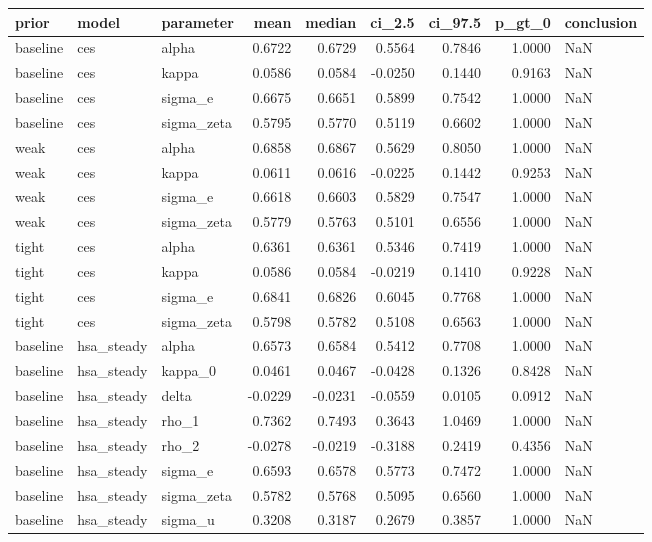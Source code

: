 \begin{tabular}{lllrrrrrl}
\toprule
prior & model & parameter & mean & median & ci\_2.5 & ci\_97.5 & p\_gt\_0 & conclusion \\
\midrule
baseline & ces & alpha & 0.6722 & 0.6729 & 0.5564 & 0.7846 & 1.0000 & NaN \\
baseline & ces & kappa & 0.0586 & 0.0584 & -0.0250 & 0.1440 & 0.9163 & NaN \\
baseline & ces & sigma\_e & 0.6675 & 0.6651 & 0.5899 & 0.7542 & 1.0000 & NaN \\
baseline & ces & sigma\_zeta & 0.5795 & 0.5770 & 0.5119 & 0.6602 & 1.0000 & NaN \\
weak & ces & alpha & 0.6858 & 0.6867 & 0.5629 & 0.8050 & 1.0000 & NaN \\
weak & ces & kappa & 0.0611 & 0.0616 & -0.0225 & 0.1442 & 0.9253 & NaN \\
weak & ces & sigma\_e & 0.6618 & 0.6603 & 0.5829 & 0.7547 & 1.0000 & NaN \\
weak & ces & sigma\_zeta & 0.5779 & 0.5763 & 0.5101 & 0.6556 & 1.0000 & NaN \\
tight & ces & alpha & 0.6361 & 0.6361 & 0.5346 & 0.7419 & 1.0000 & NaN \\
tight & ces & kappa & 0.0586 & 0.0584 & -0.0219 & 0.1410 & 0.9228 & NaN \\
tight & ces & sigma\_e & 0.6841 & 0.6826 & 0.6045 & 0.7768 & 1.0000 & NaN \\
tight & ces & sigma\_zeta & 0.5798 & 0.5782 & 0.5108 & 0.6563 & 1.0000 & NaN \\
baseline & hsa\_steady & alpha & 0.6573 & 0.6584 & 0.5412 & 0.7708 & 1.0000 & NaN \\
baseline & hsa\_steady & kappa\_0 & 0.0461 & 0.0467 & -0.0428 & 0.1326 & 0.8428 & NaN \\
baseline & hsa\_steady & delta & -0.0229 & -0.0231 & -0.0559 & 0.0105 & 0.0912 & NaN \\
baseline & hsa\_steady & rho\_1 & 0.7362 & 0.7493 & 0.3643 & 1.0469 & 1.0000 & NaN \\
baseline & hsa\_steady & rho\_2 & -0.0278 & -0.0219 & -0.3188 & 0.2419 & 0.4356 & NaN \\
baseline & hsa\_steady & sigma\_e & 0.6593 & 0.6578 & 0.5773 & 0.7472 & 1.0000 & NaN \\
baseline & hsa\_steady & sigma\_zeta & 0.5782 & 0.5768 & 0.5095 & 0.6560 & 1.0000 & NaN \\
baseline & hsa\_steady & sigma\_u & 0.3208 & 0.3187 & 0.2679 & 0.3857 & 1.0000 & NaN \\

\end{tabular}
